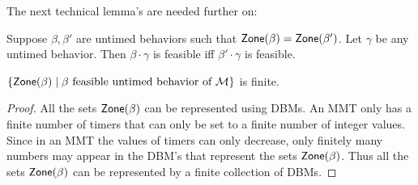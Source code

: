 The next technical lemma's are needed further on:

\begin{lemma}
\label{lemma: feasibility concatenation}
Suppose $\beta, \beta'$ are untimed behaviors such that
$\mathsf{Zone}({\beta}) = \mathsf{Zone}({\beta'})$. Let $\gamma$ be any untimed behavior.
Then $\beta \cdot \gamma$ is feasible iff $\beta' \cdot \gamma$ is feasible.
\end{lemma}

\begin{lemma}
\label{lemma finitely many zones}
$\{ \mathsf{Zone}({\beta}) \mid \beta \mbox{ feasible untimed behavior of } {\mathcal M} \}$ is finite.
\end{lemma}
\begin{proof}
All the sets $\mathsf{Zone}({\beta})$ can be represented using DBMs. An MMT only has a finite number of timers that can only be set to a finite number of integer values. Since in an MMT the values of timers can only decrease, only finitely many numbers may
appear in the DBM's that represent the sets $\mathsf{Zone}({\beta})$. Thus all the sets $\mathsf{Zone}({\beta})$ can be represented by a finite
collection of DBMs.
\end{proof}

%

